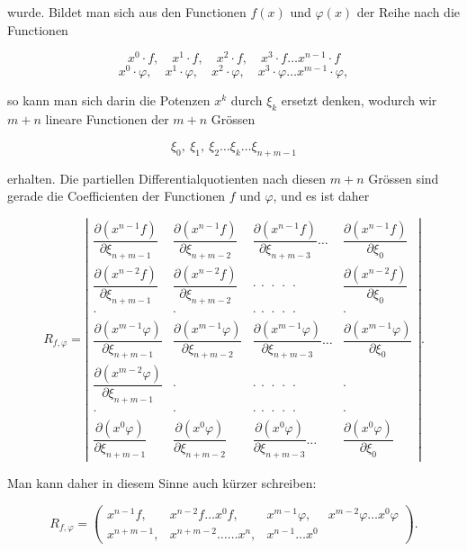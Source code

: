 \documentclass[11pt]{article}
\providecommand{\weberpage}[1]{}
\begin{document}
\weberpage{149}
wurde. Bildet man sich aus den Functionen $f(x)$ und $\varphi(x)$ der Reihe nach die
Functionen

\[ x^0\cdot f,\quad x^1\cdot f,\quad x^2\cdot f,\quad x^3\cdot f \ldots x^{n-1}\cdot f \]
\[ x^0\cdot \varphi,\quad x^1\cdot \varphi,\quad x^2\cdot \varphi,\quad x^3\cdot \varphi
\ldots x^{m-1}\cdot \varphi, \]

so kann man sich darin die Potenzen $x^k$ durch $\xi_k$ ersetzt denken, wodurch wir $m+n$
lineare Functionen der $m+n$ Gr\"ossen

\[ \xi_0,\ \xi_1,\ \xi_2 \ldots \xi_k \ldots \xi_{n+m-1} \]

erhalten. Die partiellen Differentialquotienten nach diesen $m+n$ Gr\"ossen sind gerade die
Coefficienten der Functionen $f$ und $\varphi$, und es ist daher

\[
R_{f,\varphi} =
\left|
\begin{array}{cccc}
\dfrac{\partial(x^{n-1}f)}{\partial\xi_{n+m-1}} & \dfrac{\partial(x^{n-1}f)}{\partial\xi_{n+m-2}} & \dfrac{\partial(x^{n-1}f)}{\partial\xi_{n+m-3}} \ldots & \dfrac{\partial(x^{n-1}f)}{\partial\xi_0} \\[2ex]
\dfrac{\partial(x^{n-2}f)}{\partial\xi_{n+m-1}} & \dfrac{\partial(x^{n-2}f)}{\partial\xi_{n+m-2}} & \cdot\ \cdot\ \cdot\ \cdot\ \cdot & \dfrac{\partial(x^{n-2}f)}{\partial\xi_0} \\[2ex]
\cdot & \cdot & \cdot\ \cdot\ \cdot\ \cdot\ \cdot & \cdot \\[1ex]
\dfrac{\partial(x^{m-1}\varphi)}{\partial\xi_{n+m-1}} & \dfrac{\partial(x^{m-1}\varphi)}{\partial\xi_{n+m-2}} & \dfrac{\partial(x^{m-1}\varphi)}{\partial\xi_{n+m-3}} \ldots & \dfrac{\partial(x^{m-1}\varphi)}{\partial\xi_0} \\[2ex]
\dfrac{\partial(x^{m-2}\varphi)}{\partial\xi_{n+m-1}} & \cdot & \cdot\ \cdot\ \cdot\ \cdot\ \cdot & \cdot \\[1ex]
\cdot & \cdot & \cdot\ \cdot\ \cdot\ \cdot\ \cdot & \cdot \\[1ex]
\dfrac{\partial(x^0\varphi)}{\partial\xi_{n+m-1}} & \dfrac{\partial(x^0\varphi)}{\partial\xi_{n+m-2}} & \dfrac{\partial(x^0\varphi)}{\partial\xi_{n+m-3}} \ldots & \dfrac{\partial(x^0\varphi)}{\partial\xi_0}
\end{array}
\right| .
\]

Man kann daher in diesem Sinne auch k\"urzer schreiben:

\[
R_{f,\varphi} =
\left(
\begin{array}{cccccc}
x^{n-1}f, & x^{n-2}f \ldots x^0f, & x^{m-1}\varphi, & x^{m-2}\varphi \ldots x^0\varphi \\
x^{n+m-1}, & x^{n+m-2}\ldots\ldots x^n, & x^{n-1}\ldots x^0
\end{array}
\right).
\]
\end{document}
